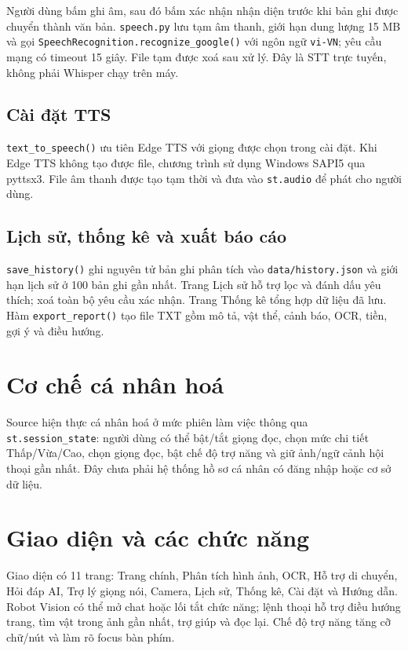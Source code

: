 Người dùng bấm ghi âm, sau đó bấm xác nhận nhận diện trước khi bản ghi được
chuyển thành văn bản. \texttt{speech.py} lưu tạm âm thanh, giới hạn dung lượng
15 MB và gọi \texttt{SpeechRecognition.recognize\_google()} với ngôn ngữ
\texttt{vi-VN}; yêu cầu mạng có timeout 15 giây. File tạm được xoá sau xử lý.
Đây là STT trực tuyến, không phải Whisper chạy trên máy.

\subsection{Cài đặt TTS}

\texttt{text\_to\_speech()} ưu tiên Edge TTS với giọng được chọn trong cài đặt.
Khi Edge TTS không tạo được file, chương trình sử dụng Windows SAPI5 qua pyttsx3. File
âm thanh được tạo tạm thời và đưa vào \texttt{st.audio} để phát cho người dùng.

\subsection{Lịch sử, thống kê và xuất báo cáo}

\texttt{save\_history()} ghi nguyên tử bản ghi phân tích vào
\texttt{data/history.json} và giới hạn lịch sử ở 100 bản ghi gần nhất. Trang Lịch
sử hỗ trợ lọc và đánh dấu yêu thích; xoá toàn bộ yêu cầu xác nhận. Trang Thống
kê tổng hợp dữ liệu đã lưu. Hàm \texttt{export\_report()} tạo file TXT gồm mô tả,
vật thể, cảnh báo, OCR, tiền, gợi ý và điều hướng.

\section{Cơ chế cá nhân hoá}

Source hiện thực cá nhân hoá ở mức phiên làm việc thông qua \texttt{st.session\_state}:
người dùng có thể bật/tắt giọng đọc, chọn mức chi tiết Thấp/Vừa/Cao, chọn giọng
đọc, bật chế độ trợ năng và giữ ảnh/ngữ cảnh hội thoại gần nhất. Đây chưa phải
hệ thống hồ sơ cá nhân có đăng nhập hoặc cơ sở dữ liệu.

\section{Giao diện và các chức năng}

Giao diện có 11 trang: Trang chính, Phân tích hình ảnh, OCR, Hỗ trợ di chuyển,
Hỏi đáp AI, Trợ lý giọng nói, Camera, Lịch sử, Thống kê, Cài đặt và Hướng dẫn.
Robot Vision có thể mở chat hoặc lối tắt chức năng; lệnh thoại hỗ trợ điều
hướng trang, tìm vật trong ảnh gần nhất, trợ giúp và đọc lại. Chế độ trợ năng
tăng cỡ chữ/nút và làm rõ focus bàn phím.

